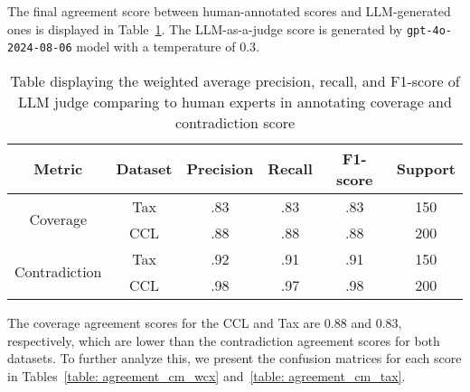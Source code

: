 The final agreement score between human-annotated scores and LLM-generated ones is displayed in Table~\ref{table: agreement_metric}. 
%
The LLM-as-a-judge score is generated by \texttt{gpt-4o-2024-08-06} \cite{gpt4o} model with a temperature of 0.3.

\begin{table}[H]
\centering



\begin{tabular}{@{}cccccc@{}}
\toprule
\textbf{Metric}                         & \textbf{Dataset} & \textbf{Precision} & \textbf{Recall} & \textbf{F1-score} & \textbf{Support} \\ \midrule
\multirow{2}{*}{Coverage}      & Tax     & .83       & .83    & .83      & 150     \\
                               & CCL     & .88       & .88    & .88      & 200     \\ \midrule
\multirow{2}{*}{Contradiction} & Tax     & .92       & .91    & .91      & 150     \\
                               & CCL     & .98       & .97    & .98      & 200     \\ \bottomrule
\end{tabular}
\caption{Table displaying the weighted average precision, recall, and F1-score of LLM judge comparing to human experts in annotating coverage and contradiction score}
\label{table: agreement_metric}
\end{table}

The coverage agreement scores for the CCL and Tax are 0.88 and 0.83, respectively, which are lower than the contradiction agreement scores for both datasets. 
%
To further analyze this, we present the confusion matrices for each score in Tables~\ref{table: agreement_cm_wcx} and~\ref{table: agreement_cm_tax}.

